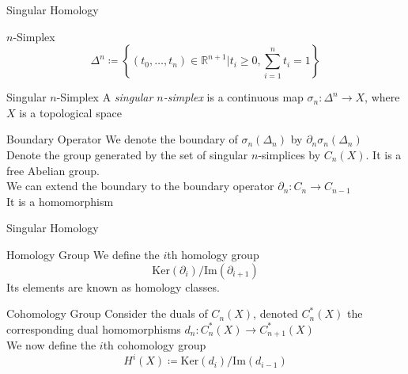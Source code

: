 \documentclass{beamer}
\newcommand{\Real}{\mathbb{R}}
\begin{document}
  \begin{frame}{Singular Homology}
      \pause
      \begin{block}{$n$-Simplex}
          $$\Delta^n \coloneqq \left\{(t_0, \ldots, t_n) \in \Real^{n+1} | t_i
          \ge 0, \sum_{i=1}^n t_i = 1\right\}$$
      \end{block}
      \pause
      \begin{block}{Singular $n$-Simplex}
          A \textit{singular $n$-simplex} is a continuous map $\sigma_n:
          \Delta^n \rightarrow X$, where $X$ is a topological space
      \end{block}
      \pause
      \begin{block}{Boundary Operator}
          We denote the boundary of $\sigma_n(\Delta_n)$ by $\partial_n
          \sigma_n (\Delta_n)$ \pause \\
          Denote the group generated by the set of singular $n$-simplices by
          $C_n(X)$. It is a free Abelian group. \pause \\
          We can extend the boundary to the boundary operator $\partial_n : C_n
          \rightarrow C_{n-1}$ \pause \\
          It is a homomorphism
      \end{block}
  \end{frame}
  \begin{frame}{Singular Homology}
      \pause
      \begin{block}{Homology Group}
          We define the $i$th homology group
          $$\mathrm{Ker}(\partial_i)/\mathrm{Im}(\partial_{i+1})$$
          Its elements are known as homology classes.
      \end{block}
      \pause
      \begin{block}{Cohomology Group}
          Consider the duals of $C_n(X)$, denoted $C^*_n(X)$ the corresponding
          dual homomorphisms $d_n : C^*_n(X) \rightarrow C^*_{n+1}(X)$ \pause
          \\
          We now define the $i$th cohomology group
          $$H^i(X) \coloneqq \mathrm{Ker}(d_i)/\mathrm{Im}(d_{i-1})$$
      \end{block}
  \end{frame}
\end{document}
